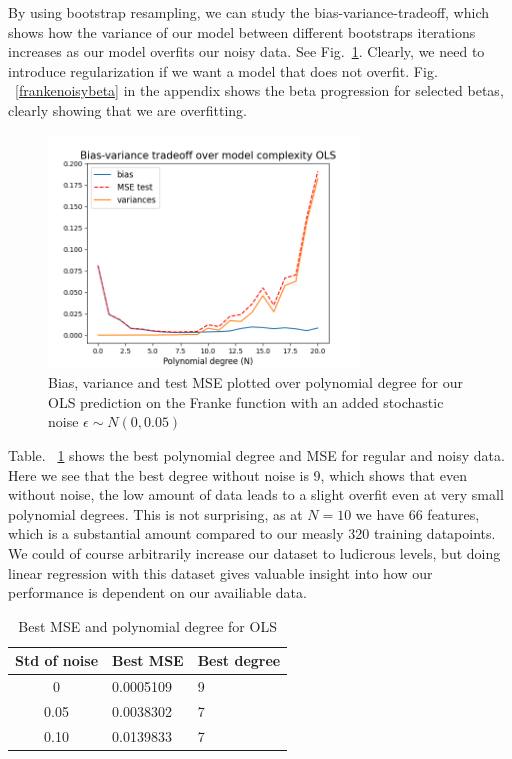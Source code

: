 \documentclass[twocolumn,10pt,cleanfoot]{asme2ej}
\begin{document}
By using bootstrap resampling, we can study the bias-variance-tradeoff, which shows how the variance of our model between different bootstraps iterations increases as our model overfits our noisy data. See Fig.~\ref{frankiebiasvariance}. Clearly, we need to introduce regularization if we want a model that does not overfit. Fig. ~\ref{frankenoisybeta} in the appendix shows the beta progression for selected betas, clearly showing that we are overfitting.

\begin{figure}[h]
\centerline{\includegraphics[width=3.25in]{figure/frankiebiasvariance.png}}
\caption{Bias, variance and test MSE plotted over polynomial degree for our OLS prediction on the Franke function with an added stochastic noise $\epsilon \sim N(0,0.05)$}
\label{frankiebiasvariance}
\end{figure}

Table. ~\ref{ols_mse_table} shows the best polynomial degree and MSE for regular and noisy data. Here we see that the best degree without noise is 9, which shows that even without noise, the low amount of data leads to a slight overfit even at very small polynomial degrees. This is not surprising, as at $N = 10$ we have $66$ features, which is a substantial amount compared to our measly 320 training datapoints. We could of course arbitrarily increase our dataset to ludicrous levels, but doing linear regression with this dataset gives valuable insight into how our performance is dependent on our availiable data.

\begin{table}[h]
\caption{Best MSE and polynomial degree for OLS}
\begin{center}
\label{ols_mse_table}
\begin{tabular}{c l l}
Std of noise & Best MSE & Best degree \\
\hline
0 & 0.0005109 & 9\\
0.05 & 0.0038302 & 7 \\
0.10 & 0.0139833 & 7 \\
\hline
\end{tabular}
\end{center}
\end{table}
\end{document}
